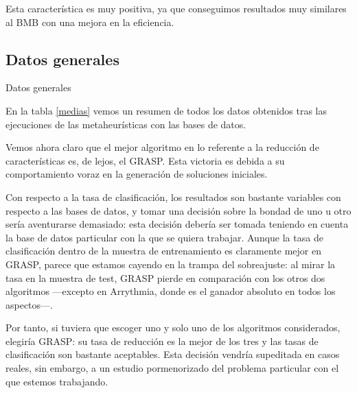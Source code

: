 \documentclass[a4paper, 11pt, titlepage]{article}
\begin{document}
    Esta característica es muy positiva, ya que conseguimos resultados muy similares al BMB con una mejora en la eficiencia.

    \subsection{Datos generales}
    \begin{table}[!htb]
        \maketablemean{\dataMedias}
        \caption{Datos generales}
        \label{medias}
    \end{table}

    En la tabla \ref{medias} vemos un resumen de todos los datos obtenidos tras las ejecuciones de las metaheurísticas con las bases de datos.

    Vemos ahora claro que el mejor algoritmo en lo referente a la reducción de características es, de lejos, el GRASP. Esta victoria es debida a su comportamiento voraz en la generación de soluciones iniciales.

    Con respecto a la tasa de clasificación, los resultados son bastante variables con respecto a las bases de datos, y tomar una decisión sobre la bondad de uno u otro sería aventurarse demasiado: esta decisión debería ser tomada teniendo en cuenta la base de datos particular con la que se quiera trabajar. Aunque la tasa de clasificación dentro de la muestra de entrenamiento es claramente mejor en GRASP, parece que estamos cayendo en la trampa del sobreajuste: al mirar la tasa en la muestra de test, GRASP pierde en comparación con los otros dos algoritmos ---excepto en Arrythmia, donde es el ganador absoluto en todos los aspectos---.

    Por tanto, si tuviera que escoger uno y solo uno de los algoritmos considerados, elegiría GRASP: su tasa de reducción es la mejor de los tres y las tasas de clasificación son bastante aceptables. Esta decisión vendría supeditada en casos reales, sin embargo, a un estudio pormenorizado del problema particular con el que estemos trabajando.
\end{document}
